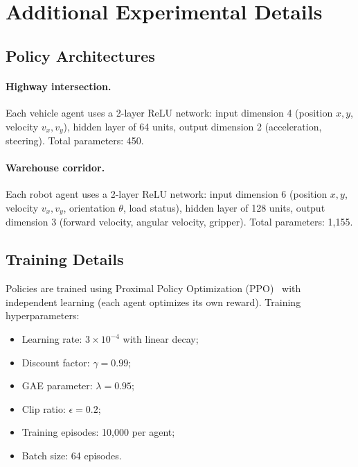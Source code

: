 \documentclass[11pt]{article}
\begin{document}
\section{Additional Experimental Details}
\label{app:experiments}

\subsection{Policy Architectures}

\paragraph{Highway intersection.}
Each vehicle agent uses a 2-layer ReLU network: input dimension 4
(position $x, y$, velocity $v_x, v_y$), hidden layer of 64 units,
output dimension 2 (acceleration, steering). Total parameters: 450.

\paragraph{Warehouse corridor.}
Each robot agent uses a 2-layer ReLU network: input dimension 6
(position $x, y$, velocity $v_x, v_y$, orientation $\theta$, load status),
hidden layer of 128 units, output dimension 3 (forward velocity, angular
velocity, gripper). Total parameters: 1,155.

\subsection{Training Details}

Policies are trained using Proximal Policy Optimization (PPO)~\cite{schulman2017proximal}
with independent learning (each agent optimizes its own reward). Training
hyperparameters:
\begin{itemize}[nosep]
\item Learning rate: $3 \times 10^{-4}$ with linear decay;
\item Discount factor: $\gamma = 0.99$;
\item GAE parameter: $\lambda = 0.95$;
\item Clip ratio: $\epsilon = 0.2$;
\item Training episodes: 10,000 per agent;
\item Batch size: 64 episodes.
\end{itemize}
\end{document}
